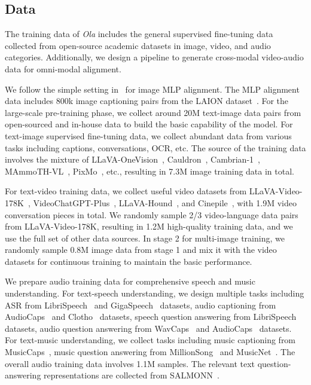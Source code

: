 \subsection{Data} \label{sec:method_data}

The training data of \textit{Ola} includes the general supervised fine-tuning data collected from open-source academic datasets in image, video, and audio categories. Additionally, we design a pipeline to generate cross-modal video-audio data for omni-modal alignment. 

We follow the simple setting in~\citep{liu2024llava15} for image MLP alignment. The MLP alignment data includes 800k image captioning pairs from the LAION dataset~\citep{schuhmann2021laion}. For the large-scale pre-training phase, we collect around 20M text-image data pairs from open-sourced and in-house data to build the basic capability of the model. For text-image supervised fine-tuning data, we collect abundant data from various tasks including captions, conversations, OCR, etc. The source of the training data involves the mixture of LLaVA-OneVision~\citep{li2024llavaov}, Cauldron~\citep{laurençon2024cauldron}, Cambrian-1~\citep{tong2024cambrian}, MAmmoTH-VL~\citep{guo2024mammoth}, PixMo~\citep{deitke2024molmo}, etc., resulting in 7.3M image training data in total. 

For text-video training data, we collect useful video datasets from LLaVA-Video-178K~\citep{zhang2024videoinstructiontuningsynthetic}, VideoChatGPT-Plus~\citep{maaz2023videochatgpt}, LLaVA-Hound~\citep{zhang2024hound}, and Cinepile~\citep{rawal2024cinepile}, with 1.9M video conversation pieces in total. We randomly sample 2/3 video-language data pairs from LLaVA-Video-178K, resulting in 1.2M high-quality training data, and we use the full set of other data sources. In stage 2 for multi-image training, we randomly sample 0.8M image data from stage 1 and mix it with the video datasets for continuous training to maintain the basic performance. 

We prepare audio training data for comprehensive speech and music understanding. For text-speech understanding, we design multiple tasks including ASR from LibriSpeech~\citep{panayotov2015librispeech} and GigaSpeech~\citep{chen2021gigaspeech} datasets, audio captioning from AudioCaps~\citep{kim2019audiocaps} and Clotho~\citep{drossos2020clotho} datasets, speech question answering from LibriSpeech~\citep{panayotov2015librispeech} datasets, audio question answering from WavCaps~\citep{mei2024wavcaps} and AudioCaps~\citep{kim2019audiocaps} datasets. For text-music understanding, we collect tasks including music captioning from MusicCaps~\citep{agostinelli2023musiclm}, music question answering from MillionSong~\citep{mcfee2012millionsong} and MusicNet~\citep{thickstun2016musicnet}. The overall audio training data involves 1.1M samples. The relevant text question-answering representations are collected from SALMONN~\citep{tang2023salmonn}.

